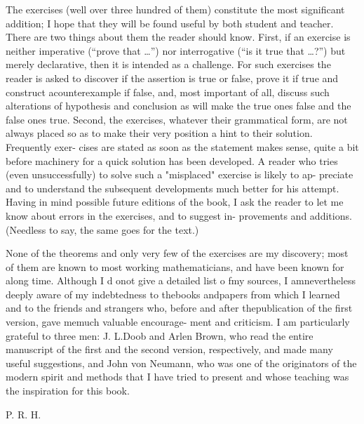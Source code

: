 The exercises (well over three hundred of them) constitute the most significant
addition; I hope that they will be found useful by both student and
teacher. There are two things about them the reader should know. First, if an
exercise is neither imperative (``prove that \ldots'') nor interrogative (``is it
true that \ldots ?'') but merely declarative, then it is intended as a challenge.
For such exercises the reader is asked to discover if the assertion is true or
false, prove it if true and construct acounterexample if false, and, most
important of all, discuss such alterations of hypothesis and conclusion as will
make the true ones false and the false ones true. Second, the exercises,
whatever their grammatical form, are not always placed so as to make their very
position a hint to their solution. Frequently exer- cises are stated as soon as
the statement makes sense, quite a bit before machinery for a quick solution has
been developed. A reader who tries (even unsuccessfully) to solve such a
"misplaced" exercise is likely to ap- preciate and to understand the subsequent
developments much better for his attempt. Having in mind possible future
editions of the book, I ask the reader to let me know about errors in the
exercises, and to suggest in- provements and additions. (Needless to say, the
same goes for the text.)

None of the theorems and only very few of the exercises
are my discovery; most of them are known to most working mathematicians, and
have been known for along time. Although I d onot give a detailed list o fmy
sources, I amnevertheless deeply aware of my indebtedness to thebooks andpapers
from which I learned and to the friends and strangers who, before and after
thepublication of the first version, gave memuch valuable encourage- ment and
criticism. I am particularly grateful to three men: J. L.Doob and Arlen Brown,
who read the entire manuscript of the first and the second version,
respectively, and made many useful suggestions, and John von Neumann, who was
one of the originators of the modern spirit and methods that I have tried to
present and whose teaching was the inspiration for this book.

\begin{flushright}
    P. R. H.
\end{flushright}
